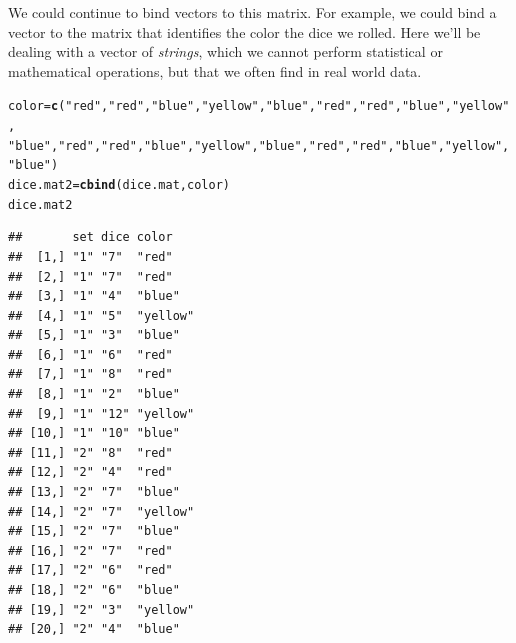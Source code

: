 \documentclass[12pt]{article}\usepackage[]{graphicx}\usepackage[]{color}
\makeatletter
\newcommand{\hlstr}[1]{\textcolor[rgb]{0.192,0.494,0.8}{#1}}%
\newcommand{\hlstd}[1]{\textcolor[rgb]{0.345,0.345,0.345}{#1}}%
\newcommand{\hlkwb}[1]{\textcolor[rgb]{0.69,0.353,0.396}{#1}}%
\newcommand{\hlkwd}[1]{\textcolor[rgb]{0.737,0.353,0.396}{\textbf{#1}}}%
\newenvironment{kframe}{%
 \def\at@end@of@kframe{}%
 \ifinner\ifhmode%
  \def\at@end@of@kframe{\end{minipage}}%
  \begin{minipage}{\columnwidth}%
 \fi\fi%
 \def\FrameCommand##1{\hskip\@totalleftmargin \hskip-\fboxsep
 \colorbox{shadecolor}{##1}\hskip-\fboxsep
     \hskip-\linewidth \hskip-\@totalleftmargin \hskip\columnwidth}%
 \MakeFramed {\advance\hsize-\width
   \@totalleftmargin\z@ \linewidth\hsize
   \@setminipage}}%
 {\par\unskip\endMakeFramed%
 \at@end@of@kframe}
\newenvironment{knitrout}{}{} %
\makeatother
\begin{document}
We could continue to bind vectors to this matrix. For example, we could bind a vector to the matrix that identifies the color the dice we rolled. Here we'll be dealing with a vector of \emph{strings}, which we cannot perform statistical or mathematical operations, but that we often find in real world data.
\begin{knitrout}
\color{fgcolor}\begin{kframe}
\begin{alltt}
\hlstd{color} \hlkwb{=} \hlkwd{c}\hlstd{(}\hlstr{"red"}\hlstd{,} \hlstr{"red"}\hlstd{,} \hlstr{"blue"}\hlstd{,} \hlstr{"yellow"}\hlstd{,} \hlstr{"blue"}\hlstd{,} \hlstr{"red"}\hlstd{,} \hlstr{"red"}\hlstd{,} \hlstr{"blue"}\hlstd{,} \hlstr{"yellow"}\hlstd{,}
    \hlstr{"blue"}\hlstd{,} \hlstr{"red"}\hlstd{,} \hlstr{"red"}\hlstd{,} \hlstr{"blue"}\hlstd{,} \hlstr{"yellow"}\hlstd{,} \hlstr{"blue"}\hlstd{,} \hlstr{"red"}\hlstd{,} \hlstr{"red"}\hlstd{,} \hlstr{"blue"}\hlstd{,} \hlstr{"yellow"}\hlstd{,}
    \hlstr{"blue"}\hlstd{)}
\hlstd{dice.mat2} \hlkwb{=} \hlkwd{cbind}\hlstd{(dice.mat, color)}
\hlstd{dice.mat2}
\end{alltt}
\begin{verbatim}
##       set dice color   
##  [1,] "1" "7"  "red"   
##  [2,] "1" "7"  "red"   
##  [3,] "1" "4"  "blue"  
##  [4,] "1" "5"  "yellow"
##  [5,] "1" "3"  "blue"  
##  [6,] "1" "6"  "red"   
##  [7,] "1" "8"  "red"   
##  [8,] "1" "2"  "blue"  
##  [9,] "1" "12" "yellow"
## [10,] "1" "10" "blue"  
## [11,] "2" "8"  "red"   
## [12,] "2" "4"  "red"   
## [13,] "2" "7"  "blue"  
## [14,] "2" "7"  "yellow"
## [15,] "2" "7"  "blue"  
## [16,] "2" "7"  "red"   
## [17,] "2" "6"  "red"   
## [18,] "2" "6"  "blue"  
## [19,] "2" "3"  "yellow"
## [20,] "2" "4"  "blue"
\end{verbatim}
\end{kframe}
\end{knitrout}
\end{document}
